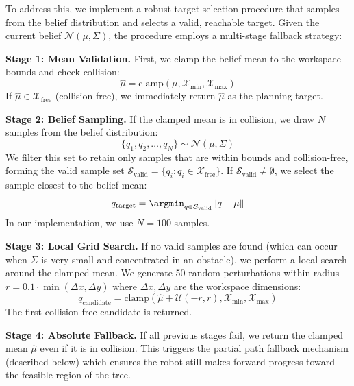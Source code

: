 To address this, we implement a robust target selection procedure that samples from the belief distribution and selects a valid, reachable target. Given the current belief $\mathcal{N}(\mu, \Sigma)$, the procedure employs a multi-stage fallback strategy:

\textbf{Stage 1: Mean Validation.} First, we clamp the belief mean to the workspace bounds and check collision:
\begin{equation}
    \hat{\mu} = \text{clamp}(\mu, \mathcal{X}_{\min}, \mathcal{X}_{\max})
\end{equation}
If $\hat{\mu} \in \mathcal{X}_{\text{free}}$ (collision-free), we immediately return $\hat{\mu}$ as the planning target.

\textbf{Stage 2: Belief Sampling.} If the clamped mean is in collision, we draw $N$ samples from the belief distribution:
\begin{equation}
    \{q_1, q_2, \ldots, q_N\} \sim \mathcal{N}(\mu, \Sigma)
\end{equation}
We filter this set to retain only samples that are within bounds and collision-free, forming the valid sample set $\mathcal{S}_{\text{valid}} = \{q_i : q_i \in \mathcal{X}_{\text{free}}\}$. If $\mathcal{S}_{\text{valid}} \neq \emptyset$, we select the sample closest to the belief mean:
\begin{equation}
    q_{\text{target}} = \argmin_{q \in \mathcal{S}_{\text{valid}}} \|q - \mu\|
\end{equation}
In our implementation, we use $N = 100$ samples.

\textbf{Stage 3: Local Grid Search.} If no valid samples are found (which can occur when $\Sigma$ is very small and concentrated in an obstacle), we perform a local search around the clamped mean. We generate 50 random perturbations within radius $r = 0.1 \cdot \min(\Delta x, \Delta y)$ where $\Delta x, \Delta y$ are the workspace dimensions:
\begin{equation}
    q_{\text{candidate}} = \text{clamp}(\hat{\mu} + \mathcal{U}(-r, r), \mathcal{X}_{\min}, \mathcal{X}_{\max})
\end{equation}
The first collision-free candidate is returned.

\textbf{Stage 4: Absolute Fallback.} If all previous stages fail, we return the clamped mean $\hat{\mu}$ even if it is in collision. This triggers the partial path fallback mechanism (described below) which ensures the robot still makes forward progress toward the feasible region of the tree.

